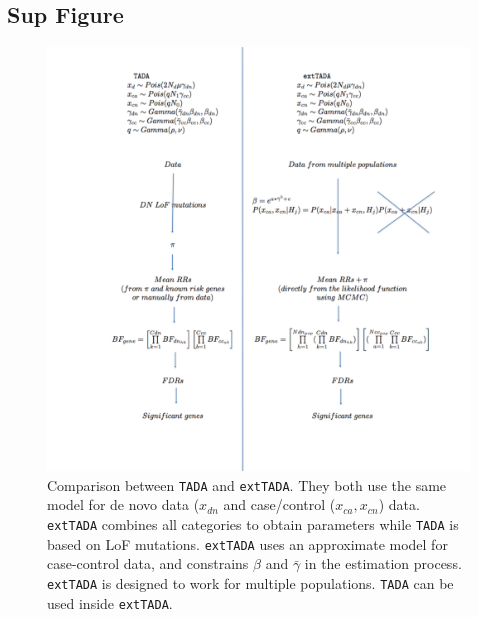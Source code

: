 \documentclass[]{article}
\begin{document}
\subsection{Sup Figure}


\begin{figure}[H]
\includegraphics[width=\textwidth,height=\textwidth]{Picture/TADAextTADAcomparison.pdf}
\caption{Comparison between \texttt{TADA} and
  \texttt{extTADA}. They both use the same model for de novo
  data ($x_{dn}$ and case/control ($x_{ca}, x_{cn}$)
  data. \texttt{extTADA} combines all categories to obtain parameters
  while \texttt{TADA} is based on LoF mutations. \texttt{extTADA} uses
  an approximate model for case-control data, and constrains $\beta$
  and $\bar{\gamma}$ in the estimation process. \texttt{extTADA} is
  designed to work for multiple populations. \texttt{TADA} can be used
  inside \texttt{extTADA}.}
\label{fig:TADAandextTADA}
\end{figure}
\end{document}
